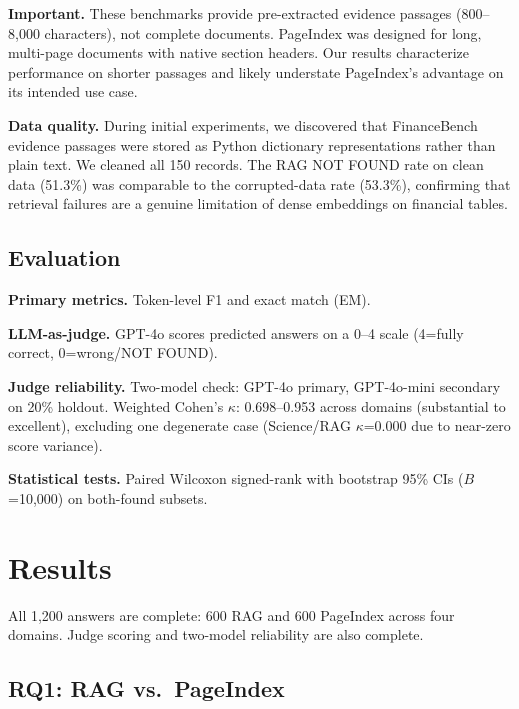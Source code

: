 \documentclass[journal]{IEEEtran}
\begin{document}
\textbf{Important.} These benchmarks provide pre-extracted evidence passages (800--8,000 characters), not complete documents. PageIndex was designed for long, multi-page documents with native section headers. Our results characterize performance on shorter passages and likely understate PageIndex's advantage on its intended use case.

\textbf{Data quality.} During initial experiments, we discovered that FinanceBench evidence passages were stored as Python dictionary representations rather than plain text. We cleaned all 150 records. The RAG NOT FOUND rate on clean data (51.3\%) was comparable to the corrupted-data rate (53.3\%), confirming that retrieval failures are a genuine limitation of dense embeddings on financial tables.

\subsection{Evaluation}
\textbf{Primary metrics.} Token-level F1 and exact match (EM).

\textbf{LLM-as-judge.} GPT-4o scores predicted answers on a 0--4 scale (4=fully correct, 0=wrong/NOT FOUND).

\textbf{Judge reliability.} Two-model check: GPT-4o primary, GPT-4o-mini secondary on 20\% holdout. Weighted Cohen's $\kappa$: 0.698--0.953 across domains (substantial to excellent), excluding one degenerate case (Science/RAG $\kappa$=0.000 due to near-zero score variance).

\textbf{Statistical tests.} Paired Wilcoxon signed-rank with bootstrap 95\% CIs ($B$=10,000) on both-found subsets.


\section{Results}
\label{sec:results}

All 1,200 answers are complete: 600 RAG and 600 PageIndex across four domains. Judge scoring and two-model reliability are also complete.

\subsection{RQ1: RAG vs.\ PageIndex}
\end{document}
